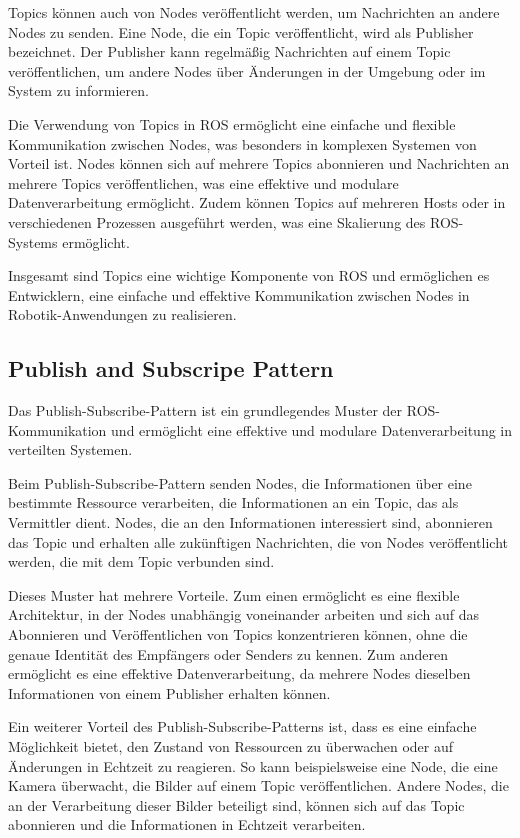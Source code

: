     Topics können auch von Nodes veröffentlicht werden, um Nachrichten an andere Nodes zu senden. Eine Node, die ein Topic veröffentlicht, wird als Publisher bezeichnet. Der Publisher kann regelmäßig Nachrichten auf einem Topic veröffentlichen, um andere Nodes über Änderungen in der Umgebung oder im System zu informieren.

    Die Verwendung von Topics in \ac{ROS} ermöglicht eine einfache und flexible Kommunikation zwischen Nodes, was besonders in komplexen Systemen von Vorteil ist. Nodes können sich auf mehrere Topics abonnieren und Nachrichten an mehrere Topics veröffentlichen, was eine effektive und modulare Datenverarbeitung ermöglicht. Zudem können Topics auf mehreren Hosts oder in verschiedenen Prozessen ausgeführt werden, was eine Skalierung des \ac{ROS}-Systems ermöglicht.

    Insgesamt sind Topics eine wichtige Komponente von \ac{ROS} und ermöglichen es Entwicklern, eine einfache und effektive Kommunikation zwischen Nodes in Robotik-Anwendungen zu realisieren.

    \subsection{Publish and Subscripe Pattern} \label{publish_and_subscripe_pattern:subsection}
    Das Publish-Subscribe-Pattern ist ein grundlegendes Muster der \ac{ROS}-Kommunikation und ermöglicht eine effektive und modulare Datenverarbeitung in verteilten Systemen.

    Beim Publish-Subscribe-Pattern senden Nodes, die Informationen über eine bestimmte Ressource verarbeiten, die Informationen an ein Topic, das als Vermittler dient. Nodes, die an den Informationen interessiert sind, abonnieren das Topic und erhalten alle zukünftigen Nachrichten, die von Nodes veröffentlicht werden, die mit dem Topic verbunden sind.

    Dieses Muster hat mehrere Vorteile. Zum einen ermöglicht es eine flexible Architektur, in der Nodes unabhängig voneinander arbeiten und sich auf das Abonnieren und Veröffentlichen von Topics konzentrieren können, ohne die genaue Identität des Empfängers oder Senders zu kennen. Zum anderen ermöglicht es eine effektive Datenverarbeitung, da mehrere Nodes dieselben Informationen von einem Publisher erhalten können.

    Ein weiterer Vorteil des Publish-Subscribe-Patterns ist, dass es eine einfache Möglichkeit bietet, den Zustand von Ressourcen zu überwachen oder auf Änderungen in Echtzeit zu reagieren. So kann beispielsweise eine Node, die eine Kamera überwacht, die Bilder auf einem Topic veröffentlichen. Andere Nodes, die an der Verarbeitung dieser Bilder beteiligt sind, können sich auf das Topic abonnieren und die Informationen in Echtzeit verarbeiten.

